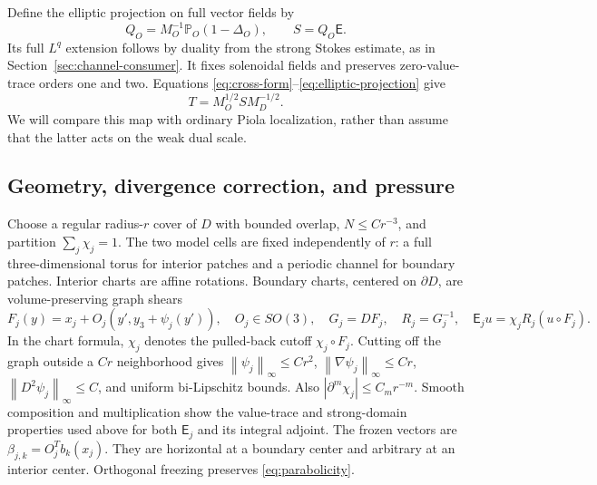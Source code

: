 \documentclass[11pt]{article}
\numberwithin{equation}{section}
\theoremstyle{remark}
\newcommand{\PP}{\mathbb P}
\newcommand{\norm}[1]{\left\lVert#1\right\rVert}
\begin{document}
Define the elliptic projection on full vector fields by
\begin{equation}\label{eq:elliptic-projection}
 Q_O=M_O^{-1}\PP_O(1-\Delta_O),\qquad S=Q_O\mathsf E.
\end{equation}
Its full $L^q$ extension follows by duality from the strong Stokes
estimate, as in Section~\ref{sec:channel-consumer}. It fixes
solenoidal fields and preserves zero-value-trace orders one and two.
Equations \eqref{eq:cross-form}--\eqref{eq:elliptic-projection} give
\begin{equation}\label{eq:T-S}
 T=M_O^{1/2}SM_D^{-1/2}.
\end{equation}
We will compare this map with ordinary Piola localization, rather than
assume that the latter acts on the weak dual scale.

\subsection{Geometry, divergence correction, and pressure}\label{sec:geometry}

Choose a regular radius-$r$ cover of $D$ with bounded overlap,
$N\leq Cr^{-3}$, and partition $\sum_j\chi_j=1$. The two model
cells are fixed independently of $r$: a full three-dimensional torus
for interior patches and a periodic channel for boundary patches.
Interior charts are affine rotations. Boundary charts, centered on
$\partial D$, are volume-preserving graph shears
\begin{equation}\label{eq:charts}
 F_j(y)=x_j+O_j(y',y_3+\psi_j(y')),\quad O_j\in SO(3),\quad
 G_j=DF_j,\quad R_j=G_j^{-1},\quad
 \mathsf E_ju=\chi_jR_j(u\circ F_j).
\end{equation}
In the chart formula, $\chi_j$ denotes the pulled-back cutoff
$\chi_j\circ F_j$. Cutting off the graph outside a $Cr$ neighborhood gives
$\norm{\psi_j}_\infty\leq Cr^2$,
$\norm{\nabla\psi_j}_\infty\leq Cr$,
$\norm{D^2\psi_j}_\infty\leq C$, and uniform bi-Lipschitz bounds.
Also $|\partial^m\chi_j|\leq C_mr^{-m}$. Smooth composition and
multiplication show the value-trace and strong-domain properties
used above for both $\mathsf E_j$ and its integral adjoint.
The frozen vectors are $\beta_{j,k}=O_j^Tb_k(x_j)$. They are
horizontal at a boundary center and arbitrary at an interior center.
Orthogonal freezing preserves \eqref{eq:parabolicity}.
\end{document}
